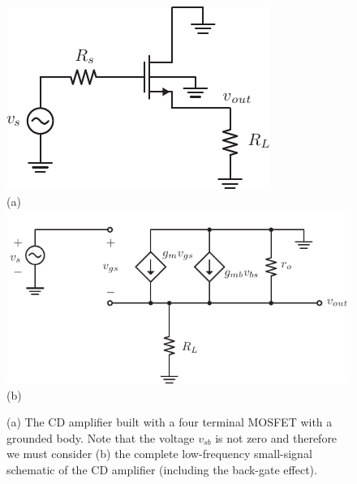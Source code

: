 \newpage
\begin{figure}[t]
\centering
\includegraphics[scale=1.25]{cd_amp_ac_body}\\
(a)\\
\includegraphics[scale=1.15]{cd_amp_ss_av_body 2}\\
(b)\\
\caption{(a) The CD amplifier built with a four terminal MOSFET with a grounded body.  Note that the voltage $v_{sb}$ is not zero and therefore we must consider (b) the complete low-frequency small-signal schematic of the CD amplifier (including the back-gate effect).}
\label{fig:cd_amp_ac_body}
\end{figure}
